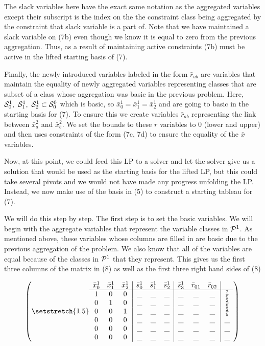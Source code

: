 \documentclass[11pt]{article} %
\newcommand{\cP}{{\cal P}}
\newcommand{\cS}{{\cal S}}
\begin{document}
	The slack variables here have the exact same notation as the aggregated variables except their subscript is the index on the the constraint class being aggregated by the constraint that slack variable is a part of.  Note that we have maintained a slack variable on (7b) even though we know it is equal to zero from the previous aggregation.  Thus, as a result of maintaining active constraints (7b) must be active in the lifted starting basis of (7).
	
	Finally, the newly introduced variables labeled in the form $\bar{r}_{ab}$ are variables that maintain the equality of newly aggregated variables representing classes that are subset of a class whose aggregation was basic in the previous problem.  Here, $\cS^1_0, \ \cS^1_1, \ \cS^1_2 \subset \cS^0_0$ which is basic, so $\bar{x}_0^1 = \bar{x}_1^1 = \bar{x}_2^1$ and are going to basic in the starting basis for (7).  To ensure this we create variables $\bar{r}_{ab}$ representing the link between $\bar{x}_a^2$ and $\bar{x}_b^2$.  We set the bounds to these $r$ variables to 0 (lower and upper) and then uses constraints of the form (7c, 7d) to ensure the equality of the $\bar{x}$ variables.
	
	Now, at this point, we could feed this LP to a solver and let the solver give us a solution that would be used as the starting basis for the lifted LP, but this could take several pivots and we would not have made any progress unfolding the LP.  Instead, we now make use of the basis in (5) to construct a starting tableau for (7). 
	
	We will do this step by step.  The first step is to set the basic variables.  We will begin with the aggregate variables that represent the variable classes in $\cP^1$.  As mentioned above, these variables whose columns are filled in are basic due to the previous aggregation of the problem.  We also know that all of the variables are equal because of the classes in $\cP^1$ that they represent.  This gives us the first three columns of the matrix in (8) as well as the first three right hand sides of (8)
	
	\begin{equation}
	\begin{pmatrix}\setstretch{1.5}
	\begin{array}{ccc|ccc|ccc|c}
	\bar{x}^1_0 & \bar{x}^1_1 & \bar{x}^1_2 & \bar{s}^1_0 & \bar{s}^1_1 & \bar{s}^1_2 & \bar{s}^1_3 & \bar{r}_{01} & \bar{r}_{02} \\
	\hline
	1 & 0 & 0 & \_ & \_ & \_ &\_ & \_ & \_ & \frac{2}{9} \\ 
	0 & 1 & 0 & \_ & \_ & \_ &\_ & \_ & \_ & \frac{2}{9} \\ 
	0 & 0 & 1 & \_& \_ & \_ &\_ & \_ & \_ & \frac{2}{9} \\ 
	0 & 0 & 0 & \_ & \_ & \_ &\_ & \_ & \_& \_ \\ 
	0 & 0 & 0 & \_ & \_ & \_ &\_ & \_ & \_& \_ \\
	0 & 0 & 0 & \_ & \_ & \_ &\_ & \_& \_ & \_ \\
	\end{array}
	\end{pmatrix}
	\end{equation}
	
\end{document}
